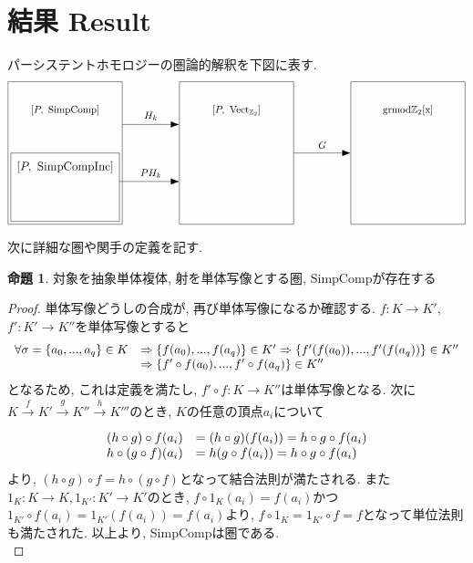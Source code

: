 \documentclass[a4paper]{jsarticle}
\theoremstyle{definition}
\newtheorem{prop}[dfn]{命題}
\newcommand{\SimpComp}{{\mathrm{SimpComp}}}
\newcommand{\Fun}[2]{[#1,~#2]}
\newcommand{\Vect}{{\mathrm{Vect}}}
\newcommand{\SimpCompInc}{{\mathrm{SimpCompInc}}}
\newcommand{\grmodZ}{{\mathrm{grmod \mathbb{Z}_2[x]}}}
\begin{document}
\section{結果 Result}
パーシステントホモロジーの圏論的解釈を下図に表す. 
\begin{equation}
    \begin{tikzpicture}
    \node at (-6, 1) {$\Fun{P}{\SimpComp}$};
    \node at (-6, -1) {{\large$\Fun{P}{\SimpCompInc}$}};
    \node at (0, 1) {$\Fun{P}{\Vect_{\mathbb{Z}_2}}$};
    \node at (6, 1) {$\grmodZ$};
    \node at (-3, 0.8) {$H_k$};
    \node at (3, -0.22) {$G$};
    \node at (-3, -1.22) {$PH_k$};
    \draw (-2,-3) rectangle (2,2);
    \draw (4,-3) rectangle (8,2);
    \draw (-8,-3) rectangle (-4,2);
    \draw (-7.9,-2.9) rectangle (-4.1,-0.5);
    \draw [-{Latex[length=3mm]}]  (-4,0.5) -- (-2, 0.5);
    \draw [-{Latex[length=3mm]}]  (-4.1,-1.5) -- (-2, -1.5);
    \draw [-{Latex[length=3mm]}]  (2,-0.5) -- (4, -0.5);
\end{tikzpicture}\notag
\end{equation}

次に詳細な圏や関手の定義を記す.
\begin{prop}
    対象を抽象単体複体, 射を単体写像とする圏, $\SimpComp$が存在する
\end{prop}
\begin{proof}
    単体写像どうしの合成が, 再び単体写像になるか確認する. $f:K\rightarrow K'$, $f':K'\rightarrow K''$を単体写像とすると
{\large
\begin{equation}
    \begin{array}{ll}
        \forall\sigma =\{a_0,...,a_q\}\in K & \Rightarrow \{f(a_0),...,f(a_q)\}\in K'\Rightarrow\{f'(f(a_0)),...,f'(f(a_q))\}\in K'' \\
         &  \Rightarrow\{f'\circ f(a_0),...,f'\circ f(a_q)\}\in K''\notag
    \end{array}
\end{equation}
}
となるため, これは定義を満たし, $f'\circ f:K\rightarrow K''$は単体写像となる. 次に$K\xrightarrow[]{f} K'\xrightarrow[]{g} K''\xrightarrow[]{h}K'''$のとき, $K$の任意の頂点$a_i$について
\begin{equation}
    \begin{array}{ll}
        (h\circ g)\circ f(a_i) & =(h\circ g)(f(a_i))=h\circ g\circ f(a_i) \\
        h\circ (g\circ f)(a_i) & =h(g\circ f(a_i))=h\circ g\circ f(a_i)\notag
    \end{array}
\end{equation}
より, $(h\circ g)\circ f=h\circ (g\circ f)$となって結合法則が満たされる. また$1_K:K\rightarrow K, 1_{K'}:K'\rightarrow K'$のとき, $f\circ 1_K(a_i)=f(a_i)$かつ$1_{K'}\circ f(a_i)=1_{K'}(f(a_i))=f(a_i)$より, $f\circ 1_K=1_{K'}\circ f=f$となって単位法則も満たされた. 以上より, SimpCompは圏である.\\
\end{proof}
\end{document}
